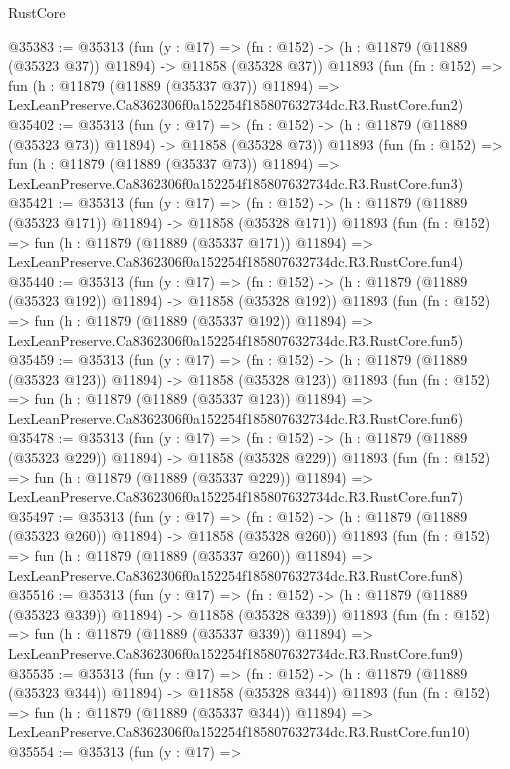 \begin{lexlean}{RustCore}
\begin{coremodule}
@35383 := @35313
    (fun (y : @17) =>
    (fn : @152) -> (h : @11879 (@11889 (@35323 @37)) @11894) -> @11858 (@35328 @37))
    @11893
    (fun (fn : @152) =>
    fun (h : @11879 (@11889 (@35337 @37)) @11894) =>
    LexLeanPreserve.Ca8362306f0a152254f185807632734dc.R3.RustCore.fun2)
@35402 := @35313
    (fun (y : @17) =>
    (fn : @152) -> (h : @11879 (@11889 (@35323 @73)) @11894) -> @11858 (@35328 @73))
    @11893
    (fun (fn : @152) =>
    fun (h : @11879 (@11889 (@35337 @73)) @11894) =>
    LexLeanPreserve.Ca8362306f0a152254f185807632734dc.R3.RustCore.fun3)
@35421 := @35313
    (fun (y : @17) =>
    (fn : @152) -> (h : @11879 (@11889 (@35323 @171)) @11894) -> @11858 (@35328 @171))
    @11893
    (fun (fn : @152) =>
    fun (h : @11879 (@11889 (@35337 @171)) @11894) =>
    LexLeanPreserve.Ca8362306f0a152254f185807632734dc.R3.RustCore.fun4)
@35440 := @35313
    (fun (y : @17) =>
    (fn : @152) -> (h : @11879 (@11889 (@35323 @192)) @11894) -> @11858 (@35328 @192))
    @11893
    (fun (fn : @152) =>
    fun (h : @11879 (@11889 (@35337 @192)) @11894) =>
    LexLeanPreserve.Ca8362306f0a152254f185807632734dc.R3.RustCore.fun5)
@35459 := @35313
    (fun (y : @17) =>
    (fn : @152) -> (h : @11879 (@11889 (@35323 @123)) @11894) -> @11858 (@35328 @123))
    @11893
    (fun (fn : @152) =>
    fun (h : @11879 (@11889 (@35337 @123)) @11894) =>
    LexLeanPreserve.Ca8362306f0a152254f185807632734dc.R3.RustCore.fun6)
@35478 := @35313
    (fun (y : @17) =>
    (fn : @152) -> (h : @11879 (@11889 (@35323 @229)) @11894) -> @11858 (@35328 @229))
    @11893
    (fun (fn : @152) =>
    fun (h : @11879 (@11889 (@35337 @229)) @11894) =>
    LexLeanPreserve.Ca8362306f0a152254f185807632734dc.R3.RustCore.fun7)
@35497 := @35313
    (fun (y : @17) =>
    (fn : @152) -> (h : @11879 (@11889 (@35323 @260)) @11894) -> @11858 (@35328 @260))
    @11893
    (fun (fn : @152) =>
    fun (h : @11879 (@11889 (@35337 @260)) @11894) =>
    LexLeanPreserve.Ca8362306f0a152254f185807632734dc.R3.RustCore.fun8)
@35516 := @35313
    (fun (y : @17) =>
    (fn : @152) -> (h : @11879 (@11889 (@35323 @339)) @11894) -> @11858 (@35328 @339))
    @11893
    (fun (fn : @152) =>
    fun (h : @11879 (@11889 (@35337 @339)) @11894) =>
    LexLeanPreserve.Ca8362306f0a152254f185807632734dc.R3.RustCore.fun9)
@35535 := @35313
    (fun (y : @17) =>
    (fn : @152) -> (h : @11879 (@11889 (@35323 @344)) @11894) -> @11858 (@35328 @344))
    @11893
    (fun (fn : @152) =>
    fun (h : @11879 (@11889 (@35337 @344)) @11894) =>
    LexLeanPreserve.Ca8362306f0a152254f185807632734dc.R3.RustCore.fun10)
@35554 := @35313
    (fun (y : @17) =>

\end{coremodule}
\end{lexlean}
